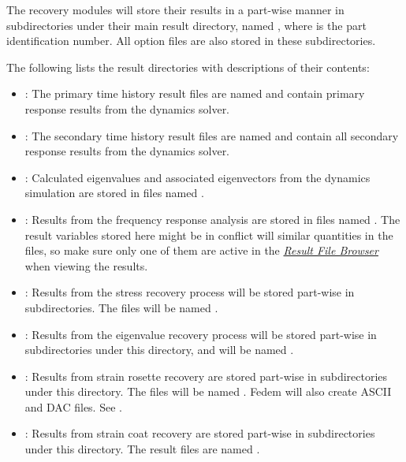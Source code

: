 The recovery modules will store their results in a part-wise manner in
subdirectories under their main result directory, named
\File{[ID]\_[partname]\_\Hashes}, where \File{[ID]} is the part identification
number. All option files are also stored in these subdirectories.

The following lists the result directories with descriptions of their contents:

\begin{itemize}

\item{} :
  The primary time history result files are named 
  and contain primary response results from the dynamics solver.

\item{} :
  The secondary time history result files are named 
  and contain all secondary response results from the dynamics solver.

\item{} :
  Calculated eigenvalues and associated eigenvectors from the
  dynamics simulation are stored in files named .

\item{} :
  Results from the frequency response analysis are stored in files named
  . The result variables stored here might be in conflict
  will similar quantities in the  files,
  so make sure only one of them are active in the
  \protect\hyperlink{result-file-browser}{\sl Result File Browser}
  when viewing the results.

\item{} :
  Results from the stress recovery process will be stored part-wise
  in subdirectories. The files will be named .

\item{} :
  Results from the eigenvalue recovery process will be stored part-wise
  in subdirectories under this directory,
  and will be named .

\item{} :
  Results from strain rosette recovery are stored part-wise in subdirectories
  under this directory. The files will be named .
  Fedem will also create ASCII and DAC files.
  See .

\item{} :
  Results from strain coat recovery are stored part-wise in subdirectories
  under this directory. The result files are named .
\end{itemize}

